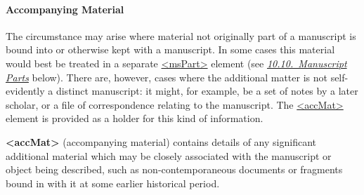 \paragraph[{Accompanying Material}]{Accompanying Material}\label{msadac}\par
The circumstance may arise where material not originally part of a manuscript is bound into or otherwise kept with a manuscript. In some cases this material would best be treated in a separate \hyperref[TEI.msPart]{<msPart>} element (see \textit{\hyperref[mspt]{10.10.\ Manuscript Parts}} below). There are, however, cases where the additional matter is not self-evidently a distinct manuscript: it might, for example, be a set of notes by a later scholar, or a file of correspondence relating to the manuscript. The \hyperref[TEI.accMat]{<accMat>} element is provided as a holder for this kind of information. 
\begin{sansreflist}
  
\item [\textbf{<accMat>}] (accompanying material) contains details of any significant additional material which may be closely associated with the manuscript or object being described, such as non-contemporaneous documents or fragments bound in with it at some earlier historical period.
\end{sansreflist}
\par
